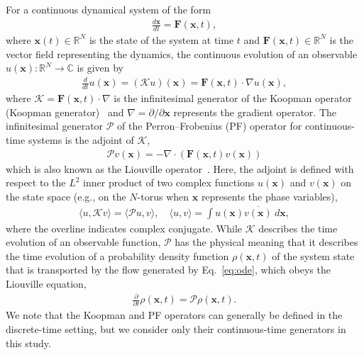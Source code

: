 \documentclass[
amsmath,amssymb,
]{revtex4-2}
\begin{document}
For a continuous dynamical system of the form 
%
\begin{align}
    \label{eq:ode} 
    \frac{d\bm{x}}{dt} = \bm{F}(\bm{x}, t),
\end{align}
where $\bm{x}(t) \in {\mathbb R}^N$ is the state of the system at time $t$ and ${\bm F}(\bm{x}, t) \in {\mathbb R}^N$ is the vector field representing the dynamics, the continuous evolution of an observable $u(\bm{x}) : {\mathbb R}^N \to {\mathbb C}$ 
is given by
%
\begin{align}
    \label{eq:Koopman_operator}
   \frac{d}{dt}u (\bm{x}) =  (\mathcal{K} u) (\bm{x}) = \bm{F}(\bm{x}, t) \cdot \nabla u(\bm{x}),
\end{align}
%
where $\mathcal{K} = \bm{F}(\bm{x}, t) \cdot \nabla$ is the infinitesimal generator of the Koopman operator (Koopman generator)~\cite{brunton2022modern} and $\nabla = \partial / \partial \bm{x}$ represents the gradient operator.
%
The infinitesimal generator $\mathcal{P}$ of the Perron--Frobenius (PF) operator for continuous-time systems is the adjoint of $\mathcal{K}$,
%
\begin{align}
    \label{eq:PF_operator}
    \mathcal{P}v(\bm{x}) = -\nabla \cdot \left( \bm{F}(\bm{x}, t) v(\bm{x}) \right) 
\end{align}
%
which is also known as the Liouville operator~\cite{Gaspard_1998,kato2021asymptotic, brunton2022modern}.
%
Here, the adjoint is defined with respect to the $L^2$ inner product of two complex functions $u(\bm{x})$ and $v(\bm{x})$ on the state space (e.g., on the $N$-torus when ${\bm x}$ represents the phase variables),
%
\begin{align}
    \langle u,\mathcal{K}v\rangle = \langle \mathcal{P}u,v\rangle,\quad \langle u, v\rangle = \int u(\bm{x}) \overline{v(\bm{x})}\ d\bm{x},
\end{align}
%
where the overline indicates complex conjugate.
%
While $\mathcal{K}$ describes the time evolution of an observable function, 
$\mathcal{P}$ has the physical meaning that it describes the time evolution of 
a probability density function $\rho({\bm x}, t)$ of the system state that is transported by the flow generated by Eq.~\eqref{eq:ode},
which obeys the Liouville equation,
%
\begin{align}
 \label{eq:continuity_eq}
 \frac{\partial}{\partial t}\rho({\bm x}, t) = \mathcal{P}\rho({\bm x}, t).
 \end{align}
%
We note that the Koopman and PF operators 
can generally be defined in the 
discrete-time setting, but we consider only their continuous-time generators in this study.
\end{document}
